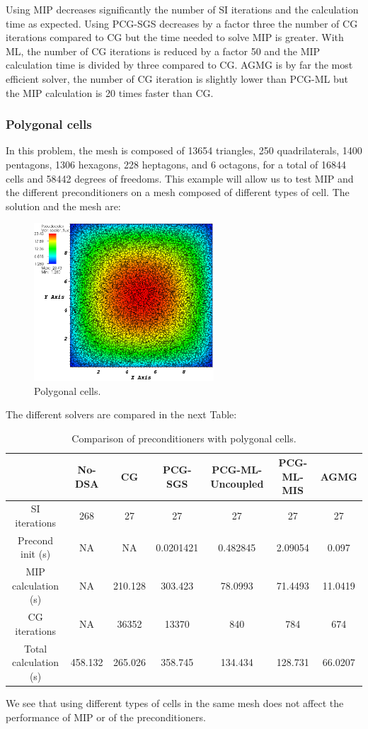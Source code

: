 Using MIP decreases significantly the number of SI iterations and the
calculation time as expected. Using PCG-SGS decreases by a factor three the 
number of CG iterations compared to CG but the time needed to solve MIP is
greater. With ML, the number of CG iterations is reduced by a factor 50 and 
the MIP calculation time is divided by three compared to CG. AGMG is by far 
the most efficient solver, the number of CG iteration is slightly lower 
than PCG-ML but the MIP calculation is 20 times faster than CG.

\subsubsection{Polygonal cells}
In this problem, the mesh is composed of 13654 triangles, 250 quadrilaterals,
1400 pentagons, 1306 hexagons, 228 heptagons, and 6 octagons, for a total of
16844 cells and 58442 degrees of freedoms. This example will allow us to test
MIP and the different preconditioners on a mesh composed of different types of
cell. The solution and the mesh are:
\begin{figure}[H]
\centering
\includegraphics[width=0.6\textwidth]{homog_poly_crop}
\caption{Polygonal cells.}
\end{figure}
The different solvers are compared in the next Table:
\begin{table}[H]
\begin{center}
\begin{tabular}{|c|c|c|c|c|c|c|}
\hline
 & No-DSA & CG & PCG-SGS & PCG-ML-Uncoupled & PCG-ML-MIS & AGMG\\
\hline
SI iterations & 268 & 27 & 27 & 27 & 27 & 27\\
Precond init (s) & NA & NA & 0.0201421 & 0.482845 & 2.09054 & 0.097\\
MIP calculation (s) & NA & 210.128 & 303.423 & 78.0993 & 71.4493 & 11.0419\\
CG iterations & NA & 36352 & 13370 & 840 & 784 & 674\\
Total calculation (s) & 458.132 & 265.026 & 358.745 & 134.434 & 128.731 &
66.0207\\
\hline
\end{tabular}
\caption{Comparison of preconditioners with polygonal cells.}
\end{center}
\end{table}
We see that using different types of cells in the same mesh does not affect
the performance of MIP or of the preconditioners. 

